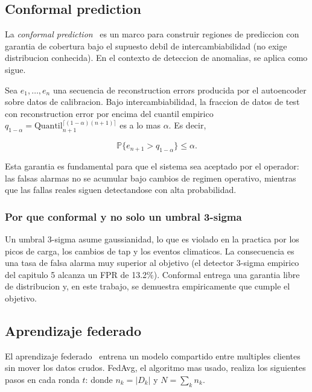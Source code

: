 \subsection{Conformal prediction}

La \emph{conformal prediction}~\citep{Vovk2005,Shafer2008} es un marco
para construir regiones de prediccion con garantia de cobertura bajo
el supuesto debil de intercambiabilidad (no exige distribucion
conhecida). En el contexto de deteccion de anomalias, se aplica como
sigue.

Sea $e_1, \dots, e_n$ una secuencia de reconstruction errors producida
por el autoencoder sobre datos de calibracion. Bajo intercambiabilidad,
la fraccion de datos de test con reconstruction error por encima del
cuantil empirico $q_{1-\alpha} = \text{Quantil}_{n+1}^{\lceil (1-\alpha)(n+1) \rceil}$
es a lo mas $\alpha$. Es decir,

\[
\mathbb{P}\{e_{n+1} > q_{1-\alpha}\} \le \alpha.
\]

Esta garantia es fundamental para que el sistema sea aceptado por el
operador: las falsas alarmas no se acumular bajo cambios de regimen
operativo, mientras que las fallas reales siguen detectandose con alta
probabilidad.

\subsubsection{Por que conformal y no solo un umbral 3-sigma}

Un umbral 3-sigma asume gaussianidad, lo que es violado en la practica
por los picos de carga, los cambios de tap y los eventos climaticos.
La consecuencia es una tasa de falsa alarma muy superior al objetivo
(el detector 3-sigma empirico del capitulo 5 alcanza un FPR de 13.2\%).
Conformal entrega una garantia libre de distribucion y, en este
trabajo, se demuestra empiricamente que cumple el objetivo.

\subsection{Aprendizaje federado}

El aprendizaje federado~\citep{McMahan2017} entrena un modelo compartido
entre multiples clientes sin mover los datos crudos. FedAvg, el
algoritmo mas usado, realiza los siguientes pasos en cada ronda $t$:
donde $n_k = |D_k|$ y $N = \sum_k n_k$.

